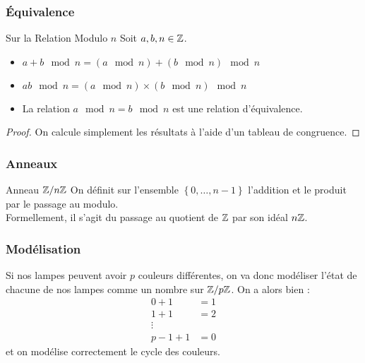 \documentclass{beamercours}
\begin{document}
\begin{frame}
    \frametitle{Équivalence}
    \begin{propositionfr}{Sur la Relation Modulo $n$}{}
        Soit $a, b, n \in \mathbb{Z}$.
        \begin{itemize}
            \item $a + b \mod n = (a \mod n) + (b \mod n) \mod n$
            \item $ab \mod n = (a \mod n) \times (b \mod n) \mod n$
            \item La relation $a \mod n = b \mod n$ est une relation d'équivalence.
        \end{itemize}
    \end{propositionfr}
    \begin{proof}
        On calcule simplement les résultats à l'aide d'un tableau de congruence.
    \end{proof}

\end{frame}

\begin{frame}
\frametitle{Anneaux}
\begin{définition}{Anneau $\mathbb{Z}/n\mathbb{Z}$}{}
On définit sur l'ensemble $\left\{0, \ldots, n - 1\right\}$ l'addition et le produit par le passage au modulo. \\
Formellement, il s'agit du passage au quotient de $\mathbb{Z}$ par son idéal $n\mathbb{Z}$.
\end{définition}
\end{frame}

\begin{frame}
    \frametitle{Modélisation}
    Si nos lampes peuvent avoir $p$ couleurs différentes, on va donc modéliser l'état de chacune de nos lampes comme un nombre sur $\mathbb{Z}/p\mathbb{Z}$. On a alors bien :
    \[
        \begin{aligned}
            0 + 1   & = 1 \\
            1 + 1   & = 2 \\
            \vdots  &     \\
            p-1 + 1 & = 0
        \end{aligned}
    \]
    et on modélise correctement le cycle des couleurs.


\end{frame}
\end{document}
